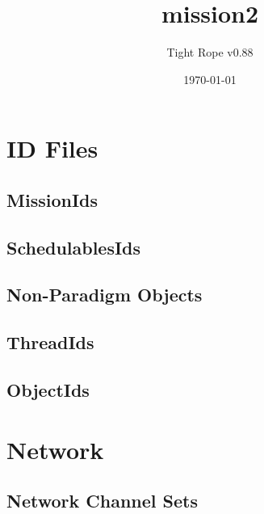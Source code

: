 \documentclass[10pt,a4paper]{article}
\title{mission2}
\author{Tight Rope v0.88}
\date{\today}
\begin{document}
\maketitle

\section{ID Files}
\subsection{MissionIds}

\newpage

\subsection{SchedulablesIds}

\newpage

\subsection{Non-Paradigm Objects}
\newpage

\subsection{ThreadIds}

\newpage

\subsection{ObjectIds}

\newpage

\section{Network}
\subsection{Network Channel Sets}




{}
\end{document}
